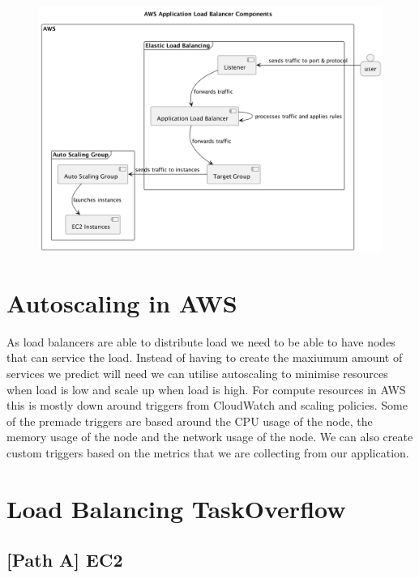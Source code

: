 \documentclass{csse4400}
\begin{document}
\begin{figure}[H]
  \includegraphics[width=\textwidth]{diagrams/loadbalancers}
\end{figure}

\section{Autoscaling in AWS}

As load balancers are able to distribute load we need to be able to have nodes that can service the load. Instead of having to create the maxiumum amount of services we predict will need we can utilise autoscaling to minimise resources when load is low and scale up when load is high. For compute resources in AWS this is mostly down around triggers from CloudWatch and scaling policies. Some of the premade triggers are based around the CPU usage of the node, the memory usage of the node and the network usage of the node. We can also create custom triggers based on the metrics that we are collecting from our application.

\section{Load Balancing TaskOverflow}

\subsection{[Path A] EC2}
\end{document}

